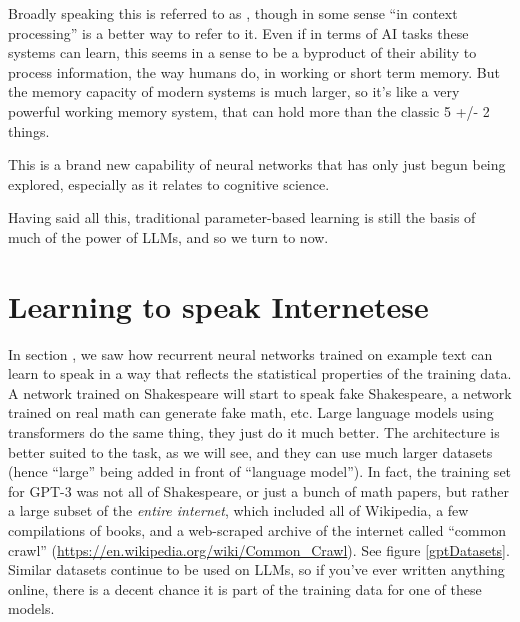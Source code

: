Broadly speaking this is referred to as , though
in some sense ``in context processing'' is a better way to refer to it. Even if
in terms of AI tasks these systems can learn, this seems in a sense to be a
byproduct of their ability to process information, the way humans do, in
working or short term memory. But the memory capacity of modern systems is much
larger, so it's like a very powerful working memory system, that can hold more
than the classic 5 +/- 2 things.  

This is a brand new capability of neural networks that has only just begun
being explored, especially as it relates to cognitive science.

Having said all this, traditional parameter-based learning is still the basis
of much of the power of LLMs, and so we turn to now.

\section{Learning to speak Internetese}\label{internetese}

In section , we saw how recurrent neural
networks trained on example text can learn to speak in a way that reflects the
statistical properties of the training data. A network trained on Shakespeare
will start to speak fake Shakespeare, a network trained on real math can
generate fake math, etc. Large language models using transformers do the same
thing, they just do it much better. The architecture is better suited to the
task, as we will see, and they can use much larger datasets (hence ``large''
being added in front of ``language model''). In fact, the training set for
GPT-3 was not all of Shakespeare, or just a bunch of math papers, but rather a
large subset of the \emph{entire internet}, which included all of Wikipedia, a
few compilations of books, and a web-scraped archive of the internet called
``common crawl'' (\url{https://en.wikipedia.org/wiki/Common_Crawl}). See figure
\ref{gptDatasets}. Similar datasets continue to be used on LLMs, so if you've
ever written anything online, there is a decent chance it is part of the
training data for one of these models. 

